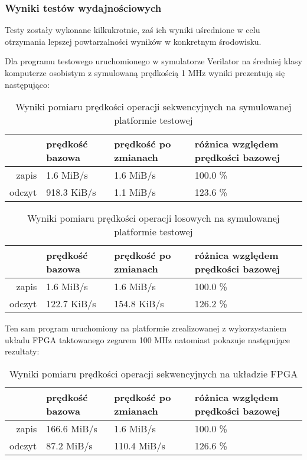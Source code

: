 
\subsubsection{Wyniki testów wydajnościowych}

Testy zostały wykonane kilkukrotnie, zaś ich wyniki uśrednione w celu otrzymania lepszej powtarzalności wyników w konkretnym środowisku.

Dla programu testowego uruchomionego w symulatorze Verilator na średniej klasy komputerze osobistym z symulowaną prędkością 1 MHz wyniki prezentują się następująco:

\begin{center}

\begin{table}[H]
\begin{tabular}{ r|l|l|l| }
  & prędkość bazowa & prędkość po zmianach & różnica względem prędkości bazowej\\
 \hline
 zapis & 1.6 MiB/s & 1.6 MiB/s & 100.0 \%\\
 odczyt & 918.3 KiB/s & 1.1 MiB/s & 123.6 \%\\
 \hline
\end{tabular}
\caption{\label{tab:benchmark-seq-sim}Wyniki pomiaru prędkości operacji sekwencyjnych na symulowanej platformie testowej}
\end{table}

\begin{table}[H]
\begin{tabular}{ r|l|l|l| }
  & prędkość bazowa & prędkość po zmianach & różnica względem prędkości bazowej\\
 \hline
 zapis & 1.6 MiB/s & 1.6 MiB/s & 100.0 \%\\
 odczyt & 122.7 KiB/s & 154.8 KiB/s & 126.2 \%\\
 \hline
\end{tabular}
\caption{\label{tab:benchmark-rnd-sim}Wyniki pomiaru prędkości operacji losowych na symulowanej platformie testowej}
\end{table}

\end{center}

Ten sam program uruchomiony na platformie zrealizowanej z wykorzystaniem układu FPGA taktowanego zegarem 100 MHz natomiast pokazuje następujące rezultaty:

\begin{table}[H]
\begin{center}
\begin{tabular}{ r|l|l|l| }
  & prędkość bazowa & prędkość po zmianach & różnica względem prędkości bazowej\\
 \hline
 zapis & 166.6 MiB/s & 1.6 MiB/s & 100.0 \%\\
 odczyt & 87.2 MiB/s & 110.4 MiB/s & 126.6 \%\\
 \hline
\end{tabular}
\end{center}
\caption{\label{tab:benchmark-seq-arty}Wyniki pomiaru prędkości operacji sekwencyjnych na układzie FPGA}
\end{table}

